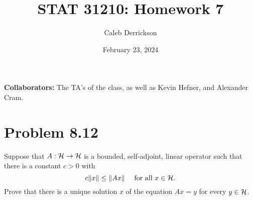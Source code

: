 

\title{STAT 31210: Homework 7}
\author{Caleb Derrickson}
\date{February 23, 2024}


\onehalfspacing
\maketitle
\allowdisplaybreaks
{\color{cit}\vspace{2mm}\noindent\textbf{Collaborators:}} The TA's of the class, as well as Kevin Hefner, and Alexander Cram.

\tableofcontents

\newpage
\section{Problem 8.12}
Suppose that $A: \mathcal{H} \rightarrow \mathcal{H}$ is a bounded, self-adjoint, linear operator such that there is a constant $c > 0$ with 
\[c \norm{x} \leq \norm{Ax} \quad \text{ for all } x \in \mathcal{H}.\]
Prove that there is a unique solution $x$ of the equation $Ax = y$ for every $y \in \mathcal{H}$.
\partbreak
